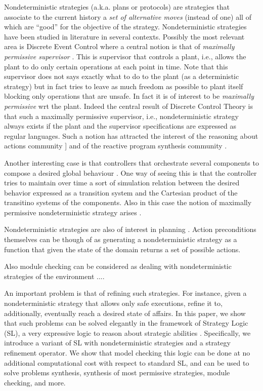 Nondeterministic strategies (a.k.a. plans or protocols) are strategies
that associate to the current history a \emph{set of alternative
  moves} (instead of one) all of which are ``good'' for the objective
of the strategy.
Nondeterministic strategies have been studied in literature in several
contexts.
Possibly the most relevant area is Discrete Event Control where a
central notion is that of \emph{maximally permissive supervisor}
\cite{WonhamRamadge:SIAMJCO87,Cassandras:BOOK06_DES,Wo14}. This is
supervisor that controls a plant, i.e., allows the plant to do only
certain operations at each point in time. Note that this supervisor
does not says exactly what to do to the plant (as a deterministic
strategy) but in fact tries to leave as much freedom as possible to
plant itself blocking only operations that are unsafe. In fact it is
of interest to be \emph{maximally permissive} wrt the plant. 
Indeed the central result of Discrete Control Theory is that such a
maximally permissive supervisor, i.e., nondeterministic strategy
always exists if the plant and the supervisor specifications are
expressed as regular languages. Such a notion has attracted the interest
of the reasoning about actions community
]\cite{DeGiacomoLM12,BanihashemiGL-AAMAS18} and of the reactive program
synthesis community \cite{pnueli1989synthesisshort,EhlersLTV17}.


Another interesting case is that controllers that orchestrate several components to compose a desired global behaviour \cite{DePS13,DeGiacomoVFAL18}. One way of seeing this is that the controller tries to maintain over time a sort of simulation relation between the desired behavior expressed as a transition system and the Cartesian product of the transitino systems of the components. Also in this case the notion of maximally permissive nondeterministic strategy arises \cite{DePS13}.


Nondeterministic strategies are also of interest in planning \cite{GeffnerBo13}.  Action preconditions themselves can be though of as generating a nondeterministic strategy  as a function that given the state of the domain returns a set of possible actions. 

Also module checking can be considered as dealing with nondeterministic strategies of the environment \cite{kupferman1997module,jamroga2014module} ....

An important problem is that of refining
  such strategies. For instance, given a nondeterministic strategy
  that allows only safe executions, refine it to, additionally,
  eventually reach a desired state of affairs.  In this paper, we show that such
  problems can be solved elegantly in the framework of Strategy Logic
  (SL), a very expressive logic to reason about strategic
  abilities \cite{chatterjee2010strategy,DBLP:journals/tocl/MogaveroMPV14,DBLP:conf/lics/MogaveroMS13,BMMRV17}. Specifically, we introduce a variant of SL with
  nondeterministic strategies and a strategy refinement operator. We
  show that model checking this logic can be done at no additional
  computational cost with respect to standard SL, and can be used to
  solve problems synthesis, synthesis of most permissive strategies,
  module checking, and more.

